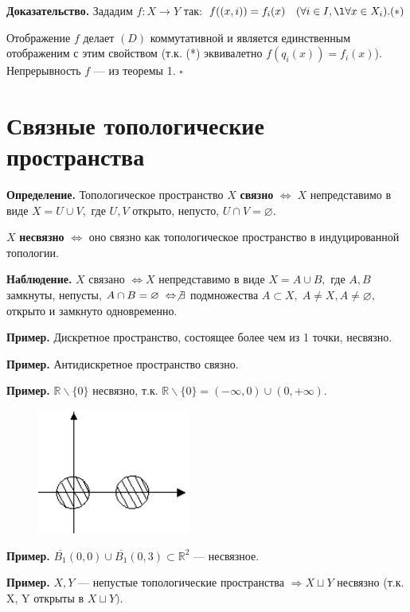 \documentclass[12pt,a4paper]{article}
\begin{document}
\textbf{Доказательство.} Зададим $f: X \to Y$ так: $f((x, i)) = f_{i}(x) \quad (\forall i \in I, \l \forall x \in X_{i}). (*)$

Отображение $f$ делает $(D)$ коммутативной и является единственным отображеним с этим свойством (т.к. (*) эквивалетно $f(q_{i}(x)) = f_{i}(x)$). Непрерывность $f$ --- из теоремы 1. $\square$ 

\section{Связные топологические пространства} 

\textbf{Определение.} Топологическое пространство $X$ \textbf{связно} $\Leftrightarrow \; X$ непредставимо в виде $X = U \cup V,$ где $U, V$ открыто, непусто, $U \cap V = \varnothing.$ 

$X$ \textbf{несвязно} $\Leftrightarrow$ оно связно как топологическое пространство в индуцированной топологии.

\textbf{Наблюдение.} $X$ связано $\Leftrightarrow X$ непредставимо в виде $X = A \cup B,$ где $A, B$ замкнуты, непусты, $A \cap B = \varnothing \; \Leftrightarrow \not \exists$ подмножества $A \subset X, \; A \neq X, A \neq \varnothing,$ открыто и замкнуто одновременно. 

\textbf{Пример.} Дискретное пространство, состоящее более чем из 1 точки, несвязно. 

\textbf{Пример.} Антидискретное пространство связно. 

\textbf{Пример.} $\mathbb{R} \backslash \{0\}$ несвязно, т.к. $\mathbb{R} \backslash \{0\} = (-\infty, 0) \cup (0, +\infty).$ 

\begin{figure}
	\includegraphics[width = 5cm]{lect7_4.png}
\end{figure}

\textbf{Пример.} $\overline{B_{1}}(0, 0) \cup \overline{B_{1}}(0, 3) \subset \mathbb{R}^{2}$ --- несвязное.

\textbf{Пример.} $X, Y$ --- непустые топологические пространства $\Rightarrow X \sqcup Y$ несвязно (т.к. X, Y открыты в $X \sqcup Y).$
\end{document}
